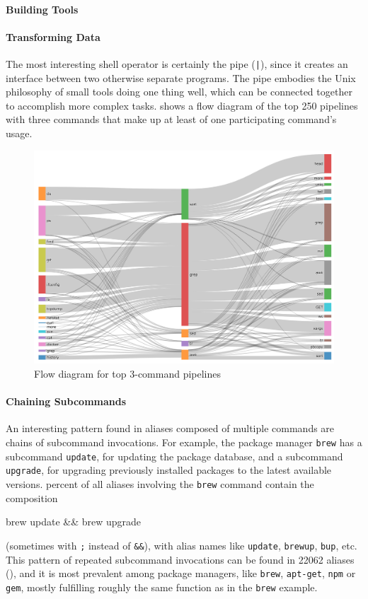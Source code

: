\paragraph{\bf Building Tools}

\paragraph{\bf Transforming Data}

The most interesting shell operator is certainly the pipe (\verb`|`), since it creates an interface between two otherwise separate programs.
The pipe embodies the Unix philosophy of small tools doing one thing well, which can be connected together to accomplish more complex tasks.
 shows a flow diagram of the top 250 pipelines with three commands that make up at least  of one participating command's usage.
\TODO

\begin{figure}[h]
	\centering    
	\includegraphics[width=0.9\linewidth]{figures/flow_250.png}
	\caption{Flow diagram for top 3-command pipelines}
	\label{fig:flow}
\end{figure}

\paragraph{\bf Chaining Subcommands}

An interesting pattern found in aliases composed of multiple commands are chains of subcommand invocations.
For example, the package manager \verb|brew| has a subcommand \verb|update|, for updating the package database, and a subcommand \verb|upgrade|, for upgrading previously installed packages to the latest available versions.
 percent of all aliases involving the \verb|brew| command contain the composition
\begin{CVerbatim}
brew update && brew upgrade
\end{CVerbatim}
(sometimes with \verb|;| instead of \verb|&&|), with alias names like \verb|update|, \verb|brewup|, \verb|bup|, etc.
This pattern of repeated subcommand invocations can be found in \num{22062} aliases (), and it is most prevalent among package managers, like \verb|brew|, \verb|apt-get|, \verb|npm| or \verb|gem|, mostly fulfilling roughly the same function as in the \verb|brew| example.

